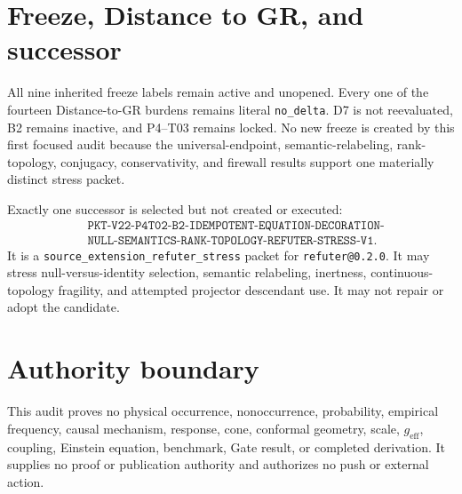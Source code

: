 \documentclass[11pt]{article}
\begin{document}
\section{Freeze, Distance to GR, and successor}

All nine inherited freeze labels remain active and unopened. Every one of the
fourteen Distance-to-GR burdens remains literal \texttt{no\_delta}. D7 is not
reevaluated, B2 remains inactive, and P4--T03 remains locked. No new freeze is
created by this first focused audit because the universal-endpoint,
semantic-relabeling, rank-topology, conjugacy, conservativity, and firewall
results support one materially distinct stress packet.

Exactly one successor is selected but not created or executed:
\[
\begin{split}
&\texttt{PKT-V22-P4T02-B2-IDEMPOTENT-EQUATION-DECORATION-}\\
&\texttt{NULL-SEMANTICS-RANK-TOPOLOGY-REFUTER-STRESS-V1}.
\end{split}
\]
It is a \texttt{source\_extension\_refuter\_stress} packet for
\texttt{refuter@0.2.0}. It may stress null-versus-identity selection, semantic
relabeling, inertness, continuous-topology fragility, and attempted projector
descendant use. It may not repair or adopt the candidate.

\section{Authority boundary}

This audit proves no physical occurrence, nonoccurrence, probability,
empirical frequency, causal mechanism, response, cone, conformal geometry,
scale, $g_{\mathrm{eff}}$, coupling, Einstein equation, benchmark, Gate result,
or completed derivation. It supplies no proof or publication authority and
authorizes no push or external action.
\end{document}
